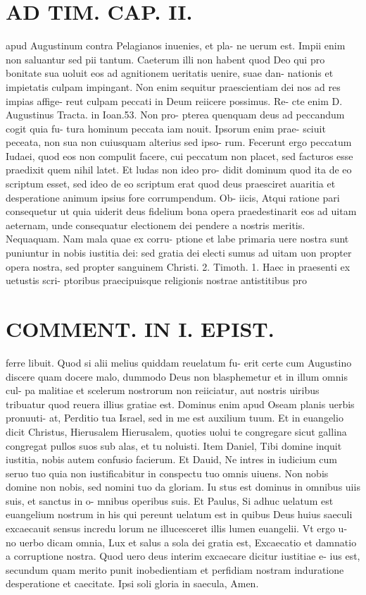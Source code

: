 \documentclass{article}
\begin{document}
\begin{pages}
\section*{AD TIM. CAP. II. }
\marginpar{[ p.116 ]}\pstart apud Augustinum contra Pelagianos inuenies, et pla- ne uerum est. Impii enim non saluantur sed pii tantum. Caeterum illi non habent quod Deo qui pro bonitate sua uoluit eos ad agnitionem ueritatis uenire, suae dan- nationis et impietatis culpam impingant. Non enim sequitur praescientiam dei nos ad res impias affige- reut culpam peccati in Deum reiicere possimus. Re- cte enim D. Augustinus Tracta. in Ioan.53. Non pro- pterea quenquam deus ad peccandum cogit quia fu- tura hominum peccata iam nouit. Ipsorum enim prae- sciuit peceata, non sua non cuiusquam alterius sed ipso- rum. Fecerunt ergo peccatum Iudaei, quod eos non compulit facere, cui peccatum non placet, sed facturos esse praedixit quem nihil latet. Et ludas non ideo pro- didit dominum quod ita de eo scriptum esset, sed ideo de eo scriptum erat quod deus praesciret auaritia et desperatione animum ipsius fore corrumpendum. Ob- iicis, Atqui ratione pari consequetur ut quia uiderit deus fidelium bona opera praedestinarit eos ad uitam aeternam, unde consequatur electionem dei pendere a nostris meritis. Nequaquam. Nam mala quae ex corru- ptione et labe primaria uere nostra sunt puniuntur in nobis iustitia dei: sed gratia dei electi sumus ad uitam uon propter opera nostra, sed propter sanguinem Christi. 2. Timoth. 1. Haec in praesenti ex uetustis scri- ptoribus praecipuisque religionis nostrae antistitibus pro  \pend
\section*{COMMENT. IN I. EPIST. }\pstart ferre libuit. Quod si alii melius quiddam reuelatum fu- erit certe cum Augustino discere quam docere malo, dummodo Deus non blasphemetur et in illum omnis cul- pa malitiae et scelerum nostrorum non reiiciatur, aut nostris uiribus tribuatur quod reuera illius gratiae est. Dominus enim apud Oseam planis uerbis pronuuti- at, Perditio tua Israel, sed in me est auxilium tuum. Et in euangelio dicit Christus, Hierusalem Hierusalem, quoties uolui te congregare sicut gallina congregat pullos suos sub alas, et tu noluisti. Item Daniel, Tibi domine inquit iustitia, nobis autem confusio facierum. Et Dauid, Ne intres in iudicium cum seruo tuo quia non iustificabitur in conspectu tuo omnis uiuens. Non nobis domine non nobis, sed nomini tuo da gloriam. Iu stus est dominus in omnibus uiis suis, et sanctus in o- mnibus operibus suis. Et Paulus, Si adhuc uelatum est euangelium nostrum in his qui pereunt uelatum est in quibus Deus huius saeculi excaecauit sensus incredu lorum ne illucesceret illis lumen euangelii. Vt ergo u- no uerbo dicam omnia, Lux et salus a sola dei gratia est, Excaecatio et damnatio a corruptione nostra. Quod uero deus interim excaecare dicitur iustitiae e- ius est, secundum quam merito punit inobedientiam et perfidiam nostram induratione desperatione et caecitate. Ipsi soli gloria in saecula, Amen.  \pend

\end{pages}
\end{document}
